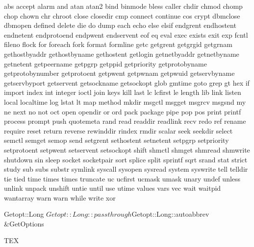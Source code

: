 \useprettyidentifiers \PLidentifiers \PLsetspecials
  abs accept alarm and atan atan2 bind binmode bless caller
  chdir chmod chomp chop chown chr chroot close closedir cmp
  connect continue cos crypt dbmclose dbmopen defined delete
  die do dump each echo else elsif endgrent endhostent
  endnetent endprotoend endpwent endservent eof eq eval exec
  exists exit exp fcntl fileno flock for foreach fork format
  formline getc getgrent getgrgid getgrnam gethostbyaddr
  gethostbyname gethostent getlogin getnetbyaddr getnetbyname
  getnetent getpeername getpgrp getppid getpriority
  getprotobyname getprotobynumber getprotoent getpwent
  getpwnam getpwuid getservbyname getservbyport getservent
  getsockname getsockopt glob gmtime goto grep gt hex if
  import index int integer ioctl join keys kill last lc
  lcfirst le length lib link listen local localtime log lstat
  lt map method mkdir msgctl msgget msgrcv msgsnd my ne next
  no not oct open opendir or ord pack package pipe pop pos
  print printf process prompt push quotemeta rand read readdir
  readlink recv redo ref rename require reset return reverse
  rewinddir rindex rmdir scalar seek seekdir select semctl
  semget semop send setgrent sethostent setnetent setpgrp
  setpriority setprotoent setpwent setservent setsockopt shift
  shmctl shmget shmread shmwrite shutdown sin sleep socket
  socketpair sort splice split sprintf sqrt srand stat strict
  study sub subs substr symlink syscall sysopen sysread system
  syswrite tell telldir tie tied time times times truncate uc
  ucfirst ucmask umask unary undef unless unlink unpack
  unshift untie until use utime values vars vec wait waitpid
  wantarray warn warn while write xor


\useprettyidentifiers \PLvariables \PLsetspecials
  Getopt::Long
  $Getopt::Long::passthrough
  $Getopt::Long::autoabbrev
  &GetOptions


\useprettyidentifiers \PLverboses \PLsetspecials
  TEX

\protect 

\endinput 
